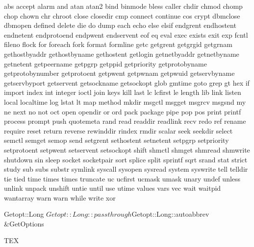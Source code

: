 \useprettyidentifiers \PLidentifiers \PLsetspecials
  abs accept alarm and atan atan2 bind binmode bless caller
  chdir chmod chomp chop chown chr chroot close closedir cmp
  connect continue cos crypt dbmclose dbmopen defined delete
  die do dump each echo else elsif endgrent endhostent
  endnetent endprotoend endpwent endservent eof eq eval exec
  exists exit exp fcntl fileno flock for foreach fork format
  formline getc getgrent getgrgid getgrnam gethostbyaddr
  gethostbyname gethostent getlogin getnetbyaddr getnetbyname
  getnetent getpeername getpgrp getppid getpriority
  getprotobyname getprotobynumber getprotoent getpwent
  getpwnam getpwuid getservbyname getservbyport getservent
  getsockname getsockopt glob gmtime goto grep gt hex if
  import index int integer ioctl join keys kill last lc
  lcfirst le length lib link listen local localtime log lstat
  lt map method mkdir msgctl msgget msgrcv msgsnd my ne next
  no not oct open opendir or ord pack package pipe pop pos
  print printf process prompt push quotemeta rand read readdir
  readlink recv redo ref rename require reset return reverse
  rewinddir rindex rmdir scalar seek seekdir select semctl
  semget semop send setgrent sethostent setnetent setpgrp
  setpriority setprotoent setpwent setservent setsockopt shift
  shmctl shmget shmread shmwrite shutdown sin sleep socket
  socketpair sort splice split sprintf sqrt srand stat strict
  study sub subs substr symlink syscall sysopen sysread system
  syswrite tell telldir tie tied time times times truncate uc
  ucfirst ucmask umask unary undef unless unlink unpack
  unshift untie until use utime values vars vec wait waitpid
  wantarray warn warn while write xor


\useprettyidentifiers \PLvariables \PLsetspecials
  Getopt::Long
  $Getopt::Long::passthrough
  $Getopt::Long::autoabbrev
  &GetOptions


\useprettyidentifiers \PLverboses \PLsetspecials
  TEX

\protect 

\endinput 
